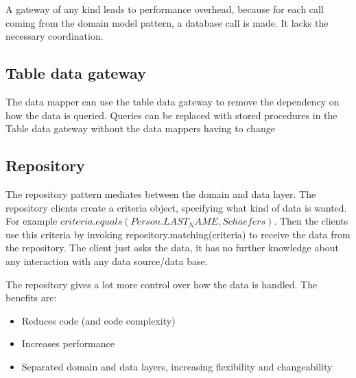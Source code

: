 A gateway of any kind leads to performance overhead, because for each call coming from the domain model pattern, a database call is made. It lacks the necessary coordination.

\subsection{Table data gateway}

The data mapper can use the table data gateway to remove the dependency on how the data is queried. Queries can be replaced with stored procedures in the Table data gateway without the data mappers having to change 


\subsection{Repository}

The repository pattern mediates between the domain and data layer. The repository clients create a criteria object, specifying what kind of data is wanted. For example $criteria.equals(Person.LAST_NAME, Schaefers)$. Then the clients use this criteria by invoking repository.matching(criteria) to receive the data from the repository. The client just asks the data, it has no further knowledge about any interaction with any data source/data base.

The repository gives a lot more control over how the data is handled. The benefits are:
\begin{itemize}
\item Reduces code (and code complexity)
\item Increases performance
\item Separated domain and data layers, increasing flexibility and changeability
\end{itemize}

